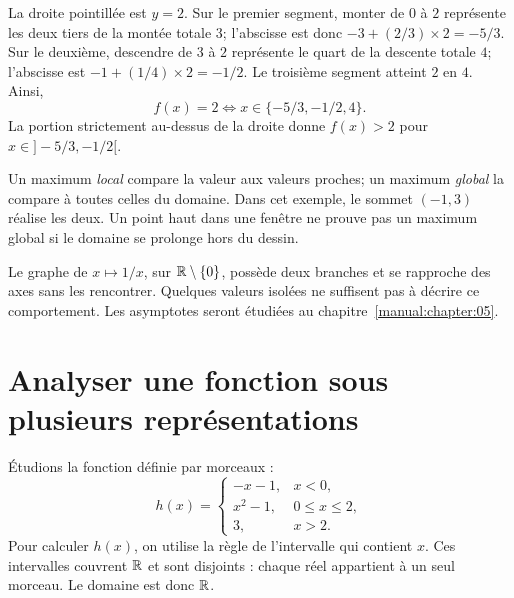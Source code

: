 \begin{center}
\end{center}

La droite pointillée est \(y=2\). Sur le premier segment, monter de \(0\) à \(2\) représente les deux tiers de la montée totale \(3\); l'abscisse est donc \(-3+(2/3)\times2=-5/3\). Sur le deuxième, descendre de \(3\) à \(2\) représente le quart de la descente totale \(4\); l'abscisse est \(-1+(1/4)\times2=-1/2\). Le troisième segment atteint \(2\) en \(4\). Ainsi,
\[
f(x)=2\iff x\in\{-5/3,-1/2,4\}.
\]
La portion strictement au-dessus de la droite donne \(f(x)>2\) pour \(x\in]-5/3,-1/2[\).

Un maximum \emph{local} compare la valeur aux valeurs proches; un maximum \emph{global} la compare à toutes celles du domaine. Dans cet exemple, le sommet \((-1,3)\) réalise les deux. Un point haut dans une fenêtre ne prouve pas un maximum global si le domaine se prolonge hors du dessin.

\begin{visualbox}
Le graphe de \(x\mapsto1/x\), sur \(\mathbb{R}\setminus\{0\}\), possède deux branches et se rapproche des axes sans les rencontrer. Quelques valeurs isolées ne suffisent pas à décrire ce comportement. Les asymptotes seront étudiées au chapitre~\ref{manual:chapter:05}.
\end{visualbox}

\section{Analyser une fonction sous plusieurs représentations}
\label{manual:section:03.08}

Étudions la fonction définie par morceaux :
\[
h(x)=\begin{cases}
-x-1,&x<0,\\
x^2-1,&0\le x\le2,\\
3,&x>2.
\end{cases}
\]
Pour calculer $h(x)$, on utilise la règle de l'intervalle qui contient $x$. Ces intervalles couvrent \(\mathbb{R}\) et sont disjoints : chaque réel appartient à un seul morceau. Le domaine est donc \(\mathbb{R}\).

